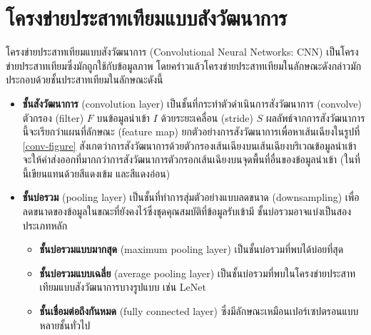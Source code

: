 \documentclass{cpereport}
\begin{document}
\section{โครงข่ายประสาทเทียมแบบสังวัฒนาการ}

โครงข่ายประสาทเทียมแบบสังวัฒนาการ (Convolutional Neural Networks: CNN) \cite{lecun-1998} เป็นโครงข่ายประสาทเทียมซึ่งมักถูกใช้กับข้อมูลภาพ \cite{Krizhevsky-2012} โดยคร่าวแล้วโครงข่ายประสาทเทียมในลักษณะดังกล่าวมักประกอบด้วยชั้นประสาทเทียมในลักษณะดังนี้

\begin{itemize}
    \item \textbf{ชั้นสังวัฒนาการ} (convolution layer) เป็นชั้นที่กระทำตัวดำเนินการสังวัฒนาการ (convolve) ตัวกรอง (filter) $F$ บนข้อมูลนำเข้า $I$ ด้วยระยะเคลื่อน (stride) $S$ ผลลัพธ์จากการสังวัฒนาการนี้จะเรียกว่าแผนที่ลักษณะ (feature map) ยกตัวอย่างการสังวัฒนาการเพื่อหาเส้นเฉียงในรูปที่ \ref{conv-figure} สังเกตว่าการสังวัฒนาการด้วยตัวกรองเส้นเฉียงบนเส้นเฉียงบริเวณข้อมูลนำเข้า จะให้ค่าส่งออกที่มากกว่าการสังวัฒนาการตัวกรอกเส้นเฉียงบนจุดพื้นที่อื่นของข้อมูลนำเข้า (ในที่นี้เขียนแทนด้วยสีแดงเข้ม และสีแดงอ่อน)
    \item \textbf{ชั้นบ่อรวม} (pooling layer)
    เป็นชั้นที่ทำการสุ่มตัวอย่างแบบลดขนาด (downsampling) เพื่อลดขนาดของข้อมูลในขณะที่ยังคงไว้ซึ่งชุดคุณสมบัติที่ข้อมูลรับเข้ามี ชั้นบ่อรวมอาจแบ่งเป็นสองประเภทหลัก
    \begin{itemize} 
        \item \textbf{ชั้นบ่อรวมแบบมากสุด} (maximum pooling layer) เป็นชั้นบ่อรวมที่พบได้บ่อยที่สุด
        \item \textbf{ชั้นบ่อรวมแบบเฉลี่ย} (average pooling layer) เป็นชั้นบ่อรวมที่พบในโครงข่ายประสาทเทียมแบบสังวัฒนาการบางรูปแบบ เช่น LeNet
        \item \textbf{ชั้นเชื่อมต่อถึงกันหมด} (fully connected layer) ซึ่งมีลักษณะเหมือนเปอร์เซปตรอนแบบหลายชั้นทั่วไป
    \end{itemize}
\end{itemize}
\end{document}

